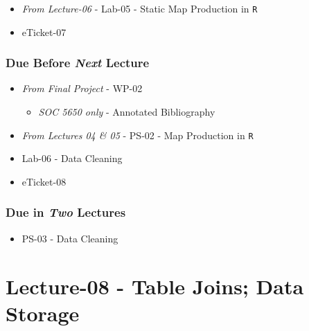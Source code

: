 \documentclass[
]{book}
\providecommand{\tightlist}{%
  \setlength{\itemsep}{0pt}\setlength{\parskip}{0pt}}
\begin{document}
\begin{itemize}
\tightlist
\item
  \emph{From Lecture-06} - Lab-05 - Static Map Production in \texttt{R}
\item
  eTicket-07
\end{itemize}

\hypertarget{due-before-next-lecture-5}{%
\subsubsection*{\texorpdfstring{Due Before \emph{Next} Lecture}{Due Before Next Lecture}}\label{due-before-next-lecture-5}}

\begin{itemize}
\tightlist
\item
  \emph{From Final Project} - WP-02

  \begin{itemize}
  \tightlist
  \item
    \emph{SOC 5650 only} - Annotated Bibliography
  \end{itemize}
\item
  \emph{From Lectures 04 \& 05} - PS-02 - Map Production in \texttt{R}
\item
  Lab-06 - Data Cleaning
\item
  eTicket-08
\end{itemize}

\hypertarget{due-in-two-lectures-3}{%
\subsubsection*{\texorpdfstring{Due in \emph{Two} Lectures}{Due in Two Lectures}}\label{due-in-two-lectures-3}}

\begin{itemize}
\tightlist
\item
  PS-03 - Data Cleaning
\end{itemize}

\hypertarget{lecture-08---table-joins-data-storage}{%
\section*{Lecture-08 - Table Joins; Data Storage}\label{lecture-08---table-joins-data-storage}}
\end{document}
